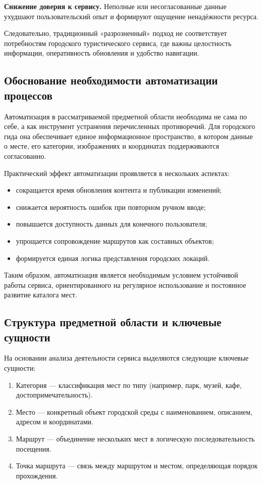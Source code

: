 \textbf{Снижение доверия к сервису.} Неполные или несогласованные данные ухудшают пользовательский опыт и формируют ощущение ненадёжности ресурса.

Следовательно, традиционный «разрозненный» подход не соответствует потребностям городского туристического сервиса, где важны целостность информации, оперативность обновления и удобство навигации.

\subsection{Обоснование необходимости автоматизации процессов}

Автоматизация в рассматриваемой предметной области необходима не сама по себе, а как инструмент устранения перечисленных противоречий. Для городского гида она обеспечивает единое информационное пространство, в котором данные о месте, его категории, изображениях и координатах поддерживаются согласованно.

Практический эффект автоматизации проявляется в нескольких аспектах:
\begin{itemize}
	\item сокращается время обновления контента и публикации изменений;
	\item снижается вероятность ошибок при повторном ручном вводе;
	\item повышается доступность данных для конечного пользователя;
	\item упрощается сопровождение маршрутов как составных объектов;
	\item формируется единая логика представления городских локаций.
\end{itemize}

Таким образом, автоматизация является необходимым условием устойчивой работы сервиса, ориентированного на регулярное использование и постоянное развитие каталога мест.

\subsection{Структура предметной области и ключевые сущности}

На основании анализа деятельности сервиса выделяются следующие ключевые сущности:
\begin{enumerate}
	\item Категория --- классификация мест по типу (например, парк, музей, кафе, достопримечательность).
	\item Место --- конкретный объект городской среды с наименованием, описанием, адресом и координатами.
	\item Маршрут --- объединение нескольких мест в логическую последовательность посещения.
	\item Точка маршрута --- связь между маршрутом и местом, определяющая порядок прохождения.
\end{enumerate}

